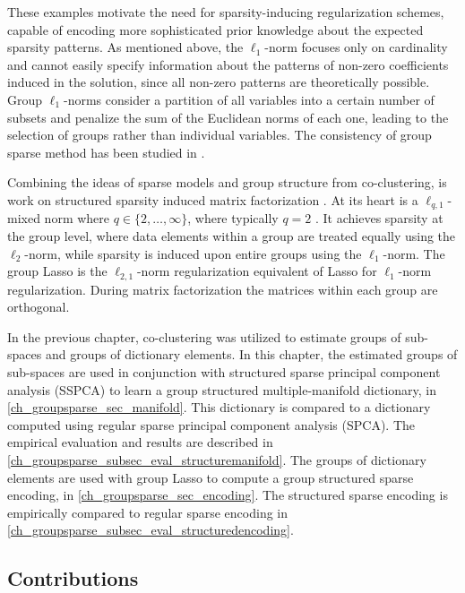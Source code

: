 These examples motivate the need for sparsity-inducing regularization schemes, capable of encoding more sophisticated prior knowledge about the expected sparsity patterns. As mentioned above, the $\ell_{1}$-norm focuses only on cardinality and cannot easily specify information about the patterns of non-zero coefficients induced in the solution, since all non-zero patterns are theoretically possible. Group $\ell_{1}$-norms \citep{Yuan2006, Roth2008, Huang2009} consider a partition of all variables into a certain number of subsets and penalize the sum of the Euclidean norms of each one, leading to the selection of groups rather than individual variables. The consistency of group sparse method has been studied in \citep{Bach2008}.

Combining the ideas of sparse models and group structure from co-clustering, is work on structured sparsity induced matrix factorization \citep{Kim2012}. At its heart is a $\ell_{q,1}$-mixed norm where $q \in \{2, \ldots, \infty \}$, where typically $q = 2$ \citep{Liu2008a}. It achieves sparsity at the group level, where data elements within a group are treated equally using the $\ell_{2}$-norm, while sparsity is induced upon entire groups using the $\ell_{1}$-norm. The group Lasso \citep{Bach2008} is the $\ell_{2,1}$-norm regularization equivalent of Lasso \citep{Tibshirani1994} for $\ell_{1}$-norm regularization. During matrix factorization the matrices within each group are orthogonal.

In the previous chapter, co-clustering was utilized to estimate groups of sub-spaces and groups of dictionary elements. In this chapter, the estimated groups of sub-spaces are used in conjunction with structured sparse principal component analysis (SSPCA) to learn a group structured multiple-manifold dictionary, in \cref{ch_groupsparse_sec_manifold}. This dictionary is compared to a dictionary computed using regular sparse principal component analysis (SPCA). The empirical evaluation and results are described in \cref{ch_groupsparse_subsec_eval_structuremanifold}. The groups of dictionary elements are used with group Lasso to compute a group structured sparse encoding, in \cref{ch_groupsparse_sec_encoding}. The structured sparse encoding is empirically compared to regular sparse encoding in \cref{ch_groupsparse_subsec_eval_structuredencoding}. 

\subsection{Contributions}
\label{ch_groupsparse_subsec_contributions}

